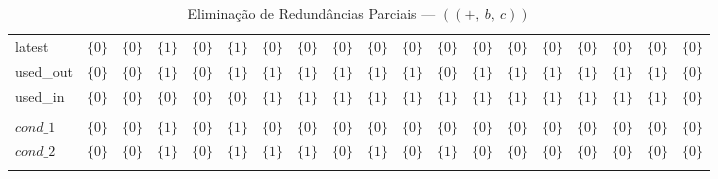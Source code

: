 \begin{table}[ht]
\begin{tabular}{l|c|c|c|c|c|c|c|c|c|c|c|c|c|c|c|c|c|c}
latest & $\{0\}$ & $\{0\}$ & $\{1\}$ & $\{0\}$ & $\{1\}$ & $\{0\}$ & $\{0\}$ & $\{0\}$ & $\{0\}$ & $\{0\}$ & $\{0\}$ & $\{0\}$ & $\{0\}$ & $\{0\}$ & $\{0\}$ & $\{0\}$ & $\{0\}$ & $\{0\}$ \\
used\_out & $\{0\}$ & $\{0\}$ & $\{1\}$ & $\{0\}$ & $\{1\}$ & $\{1\}$ & $\{1\}$ & $\{1\}$ & $\{1\}$ & $\{1\}$ & $\{0\}$ & $\{1\}$ & $\{1\}$ & $\{1\}$ & $\{1\}$ & $\{1\}$ & $\{1\}$ & $\{0\}$ \\
used\_in & $\{0\}$ & $\{0\}$ & $\{0\}$ & $\{0\}$ & $\{0\}$ & $\{1\}$ & $\{1\}$ & $\{1\}$ & $\{1\}$ & $\{1\}$ & $\{1\}$ & $\{1\}$ & $\{1\}$ & $\{1\}$ & $\{1\}$ & $\{1\}$ & $\{1\}$ & $\{0\}$ \\
 &  &  &  &  &  &  &  &  &  &  &  &  &  &  &  &  &  &  \\
$cond\_1$ & $\{0\}$ & $\{0\}$ & $\{1\}$ & $\{0\}$ & $\{1\}$ & $\{0\}$ & $\{0\}$ & $\{0\}$ & $\{0\}$ & $\{0\}$ & $\{0\}$ & $\{0\}$ & $\{0\}$ & $\{0\}$ & $\{0\}$ & $\{0\}$ & $\{0\}$ & $\{0\}$ \\
$cond\_2$ & $\{0\}$ & $\{0\}$ & $\{1\}$ & $\{0\}$ & $\{1\}$ & $\{1\}$ & $\{1\}$ & $\{0\}$ & $\{1\}$ & $\{0\}$ & $\{1\}$ & $\{0\}$ & $\{0\}$ & $\{0\}$ & $\{0\}$ & $\{0\}$ & $\{0\}$ & $\{0\}$ \\
\\
\end{tabular}
\caption{Elimina\c{c}\~ao de Redund\^ancias Parciais --- $((+,\:b,\:c))$}
\end{table}



